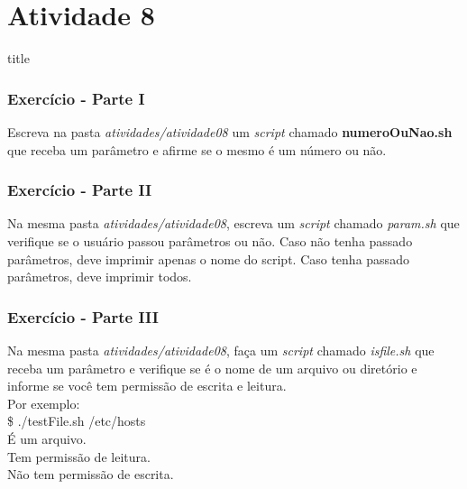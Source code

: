 \documentclass{beamer}
\begin{document}
\section{Atividade 8}
   \begin{frame}
      \begin{beamercolorbox}[sep=8pt,center,shadow=true,rounded=true]{title}
      \insertsectionhead\par%
      \end{beamercolorbox}
   \end{frame}

   \begin{frame}
      \frametitle{Exercício - Parte I}
      Escreva na pasta \textit{atividades/atividade08} um \textit{script} chamado \textbf{numeroOuNao.sh} que receba um parâmetro e afirme se o mesmo é um número ou não.
   \end{frame}

   \begin{frame}
      \frametitle{Exercício - Parte II}
      Na mesma pasta \textit{atividades/atividade08}, escreva um \textit{script} chamado \textit{param.sh} que verifique se o usuário passou parâmetros ou não. Caso não tenha passado parâmetros, deve imprimir apenas o nome do script. Caso tenha passado parâmetros, deve imprimir todos.
   \end{frame}

   \begin{frame}
      \frametitle{Exercício - Parte III}
      Na mesma pasta \textit{atividades/atividade08}, faça um \textit{script} chamado \textit{isfile.sh} que receba um parâmetro e verifique se é o nome de um arquivo ou diretório e informe se você tem permissão de escrita e leitura. \\
      Por exemplo: \\
      \$ .\slash testFile.sh /etc/hosts \\
      É um arquivo. \\
      Tem permissão de leitura. \\
      Não tem permissão de escrita. \\
   \end{frame}
\end{document}
